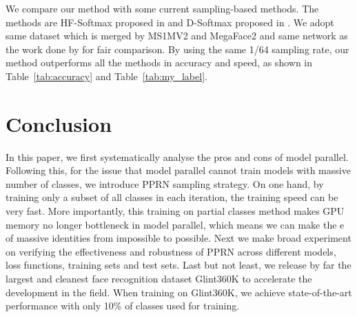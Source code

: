 \documentclass[letterpaper]{article} \usepackage{style/aaai21}  \usepackage{times}  \usepackage{helvet} \usepackage{courier}  \usepackage[hyphens]{url}  \usepackage{graphicx} \usepackage{color}
\begin{document}
We compare our method with some current sampling-based methods.  The methods are HF-Softmax proposed in \cite{zhang2018accelerated} and D-Softmax proposed in \cite{he2020softmax}. We adopt same dataset which is merged by MS1MV2 \cite{deng2019arcface} and MegaFace2 \cite{nech2017level} and same network as the work done by \cite{zhang2018accelerated,he2020softmax} for fair comparison. By using the same 1/64 sampling rate, our method outperforms all the methods in accuracy and speed, as shown in Table~\ref{tab:accuracy} and Table~\ref{tab:my_label}.


\section{Conclusion}
In this paper, we first systematically analyse the pros and cons of model parallel. Following this, for the issue that model parallel cannot train models with massive number of classes, we introduce PPRN sampling strategy. On one hand, by training only a subset of all classes in each iteration, the training speed can be very fast. More importantly, this training on partial classes method makes GPU memory no longer bottleneck in model parallel, which means we can make the e of massive identities from impossible to possible. Next we make broad experiment on verifying the effectiveness and robustness of PPRN across different models, loss functions, training sets and test sets. Last but not least, we release by far the largest and cleanest face recognition dataset Glint360K to accelerate the development in the field. When training on Glint360K, we achieve state-of-the-art performance with only 10\% of classes used for training.


\end{document}
